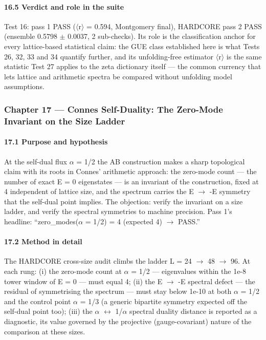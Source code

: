 \documentclass[10pt]{article}
\begin{document}
\paragraph{16.5 Verdict and role in the suite}

Test 16: pass 1 PASS ($\langle$r$\rangle$ = 0.594, Montgomery final), HARDCORE pass 2 PASS (ensemble 0.5798 $\pm$ 0.0037, 2 sub-checks). Its role is the classification anchor for every lattice-based statistical claim: the GUE class established here is what Tests 26, 32, 33 and 34 quantify further, and its unfolding-free estimator $\langle$r$\rangle$ is the same statistic Test 27 applies to the zeta dictionary itself --- the common currency that lets lattice and arithmetic spectra be compared without unfolding model assumptions.

\subsubsection{Chapter 17 --- Connes Self-Duality: The Zero-Mode Invariant on the Size Ladder}

\paragraph{17.1 Purpose and hypothesis}

At the self-dual flux $\alpha$ = 1/2 the AB construction makes a sharp topological claim with its roots in Connes' arithmetic approach: the zero-mode count --- the number of exact E = 0 eigenstates --- is an invariant of the construction, fixed at 4 independent of lattice size, and the spectrum carries the E $\rightarrow$ -E symmetry that the self-dual point implies. The objection: verify the invariant on a size ladder, and verify the spectral symmetries to machine precision. Pass 1's headline: ``zero\_modes($\alpha$ = 1/2) = 4 (expected 4) $\rightarrow$ PASS.''

\paragraph{17.2 Method in detail}

The HARDCORE cross-size audit climbs the ladder L = 24 $\rightarrow$ 48 $\rightarrow$ 96. At each rung: (i) the zero-mode count at $\alpha$ = 1/2 --- eigenvalues within the 1e-8 tower window of E = 0 --- must equal 4; (ii) the E $\rightarrow$ -E spectral defect --- the residual of symmetrising the spectrum --- must stay below 1e-10 at both $\alpha$ = 1/2 and the control point $\alpha$ = 1/3 (a generic bipartite symmetry expected off the self-dual point too); (iii) the $\alpha$ $\leftrightarrow$ 1/$\alpha$ spectral duality distance is reported as a diagnostic, its value governed by the projective (gauge-covariant) nature of the comparison at these sizes.
\end{document}
